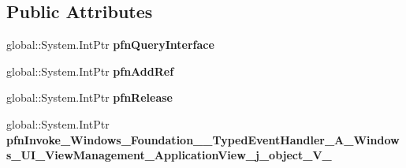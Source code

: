 \subsection*{Public Attributes}
\begin{DoxyCompactItemize}
\item 
\mbox{\label{struct_windows_1_1_foundation_1_1_typed_event_handler___a___windows___u_i___view_management___apae42b7600dab322722f60f9705736124_a1832f52102d1640e1f05164b56529caa}} 
global\+::\+System.\+Int\+Ptr {\bfseries pfn\+Query\+Interface}
\item 
\mbox{\label{struct_windows_1_1_foundation_1_1_typed_event_handler___a___windows___u_i___view_management___apae42b7600dab322722f60f9705736124_a1586dbeef929f0846a9854180eeba6e0}} 
global\+::\+System.\+Int\+Ptr {\bfseries pfn\+Add\+Ref}
\item 
\mbox{\label{struct_windows_1_1_foundation_1_1_typed_event_handler___a___windows___u_i___view_management___apae42b7600dab322722f60f9705736124_a54ea190cd927b332c089cbb2f5ab64ef}} 
global\+::\+System.\+Int\+Ptr {\bfseries pfn\+Release}
\item 
\mbox{\label{struct_windows_1_1_foundation_1_1_typed_event_handler___a___windows___u_i___view_management___apae42b7600dab322722f60f9705736124_af69d88f97aa348e8158bc63be4f417f8}} 
global\+::\+System.\+Int\+Ptr {\bfseries pfn\+Invoke\+\_\+\+Windows\+\_\+\+Foundation\+\_\+\+\_\+\+Typed\+Event\+Handler\+\_\+\+A\+\_\+\+Windows\+\_\+\+U\+I\+\_\+\+View\+Management\+\_\+\+Application\+View\+\_\+j\+\_\+object\+\_\+\+V\+\_\+}
\end{DoxyCompactItemize}

